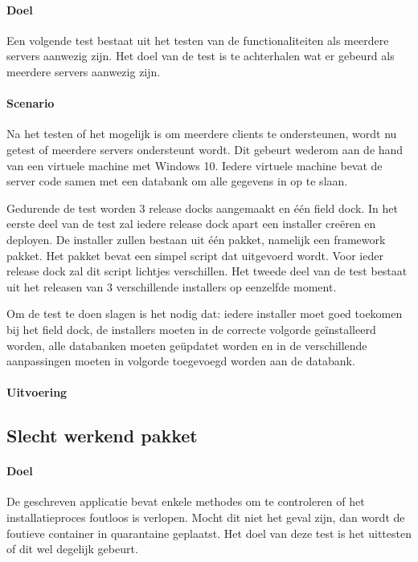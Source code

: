 \paragraph{Doel}
Een volgende test bestaat uit het testen van de functionaliteiten als meerdere servers aanwezig zijn.
Het doel van de test is te achterhalen wat er gebeurd als meerdere servers aanwezig zijn.

\paragraph{Scenario}
Na het testen of het mogelijk is om meerdere clients te ondersteunen, wordt nu getest of meerdere servers ondersteunt wordt.
Dit gebeurt wederom aan de hand van een virtuele machine met Windows 10.
Iedere virtuele machine bevat de server code samen met een databank om alle gegevens in op te slaan.

Gedurende de test worden 3 release docks aangemaakt en één field dock.
In het eerste deel van de test zal iedere release dock apart een installer creëren en deployen.
De installer zullen bestaan uit één pakket, namelijk een framework pakket.
Het pakket bevat een simpel script dat uitgevoerd wordt.
Voor ieder release dock zal dit script lichtjes verschillen.
Het tweede deel van de test bestaat uit het releasen van 3 verschillende installers op eenzelfde moment.

Om de test te doen slagen is het nodig dat: iedere installer moet goed toekomen bij het field dock, de installers moeten in de correcte volgorde geïnstalleerd worden, alle databanken moeten geüpdatet worden en in de verschillende aanpassingen moeten in volgorde toegevoegd worden aan de databank.

\paragraph{Uitvoering}


\subsection{Slecht werkend pakket}
\paragraph{Doel}
De geschreven applicatie bevat enkele methodes om te controleren of het installatieproces foutloos is verlopen.
Mocht dit niet het geval zijn, dan wordt de foutieve container in quarantaine geplaatst.
Het doel van deze test is het uittesten of dit wel degelijk gebeurt.

